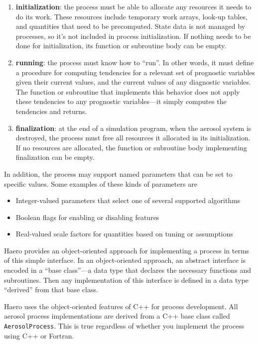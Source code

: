 \begin{enumerate}
  \item {\bf initialization}: the process must be able to allocate any resources
        it needs to do its work. These resources include temporary work arrays,
        look-up tables, and quantities that need to be precomputed. State data
        is not managed by processes, so it's not included in process
        initialization. If nothing needs to be done for initialization, its
        function or subroutine body can be empty.
  \item {\bf running}: the process must know how to ``run''. In other words, it
        must define a procedure for computing tendencies for a relevant set of
        prognostic variables given their current values, and the current values
        of any diagnostic variables. The function or subroutine that implements
        this behavior does not apply these tendencies to any prognostic
        variables---it simply computes the tendencies and returns.
  \item {\bf finalization}: at the end of a simulation program, when the aerosol
        system is destroyed, the process must free all resources it allocated
        in its initialization. If no resources are allocated, the function or
        subroutine body implementing finalization can be empty.
\end{enumerate}

In addition, the process may support named parameters that can be set to
specific values. Some examples of these kinds of parameters are

\begin{itemize}
  \item Integer-valued parameters that select one of several supported algorithms
  \item Boolean flags for enabling or disabling features
  \item Real-valued scale factors for quantities based on tuning or assumptions
\end{itemize}

Haero provides an object-oriented approach for implementing a process in terms
of this simple interface. In an object-oriented approach, an abstract interface
is encoded in a ``base class''---a data type that declares the necessary
functions and subroutines. Then any implementation of this interface is defined
in a data type ``derived'' from that base class.

Haero uses the object-oriented features of C++ for process development. All
aerosol process implementations are derived from a C++ base class called
\texttt{AerosolProcess}. This is true regardless of whether you implement the
process using C++ or Fortran.

